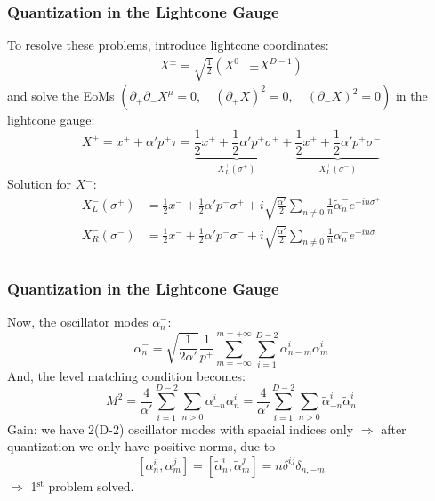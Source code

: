 \documentclass[aspectratio=169]{beamer}
\begin{document}
	\begin{frame}
		\frametitle{Quantization in the Lightcone Gauge}
		To resolve these problems, introduce lightcone coordinates:
		\begin{align*}
			X^\pm = \sqrt{\frac{1}{2}} \left(X^0\right.&\left.\pm X^{D-1}\right)
		\end{align*}
		and solve the EoMs $\left(\partial_+\partial_-X^\mu = 0, \quad (\partial_+X)^2 = 0, \quad (\partial_-X)^2 = 0 \right)$  in the lightcone gauge: 
		\begin{equation*}
			X^+ = x^+ + \alpha'p^+ \tau = \underbrace{\frac{1}{2}x^+ + \frac{1}{2} \alpha' p^+ \sigma^+}_{X^+_L(\sigma^+)} + \underbrace{\frac{1}{2}x^+ + \frac{1}{2} \alpha' p^+ \sigma^-}_{X^+_L(\sigma^-)}
		\end{equation*}
		Solution for $X^-$:
		\begin{align*}
			X^-_L(\sigma^+) &= \frac{1}{2}x^- + \frac{1}{2} \alpha' p^- \sigma^+ + i \sqrt{\frac{\alpha'}{2}} \sum_{n\neq 0} \frac{1}{n}\tilde{\alpha}^-_n e^{-in\sigma^+}\\
			X^-_R(\sigma^-) &= \frac{1}{2}x^- + \frac{1}{2} \alpha' p^-\sigma^- + i \sqrt{\frac{\alpha'}{2}} \sum_{n\neq 0} \frac{1}{n}\alpha^-_n e^{-in\sigma^-} \\
		\end{align*}
	\end{frame}

	\begin{frame}
		\frametitle{Quantization in the Lightcone Gauge}
		Now, the oscillator modes $\alpha^-_n$:
		\begin{equation*}
			\alpha_n^- = \sqrt{\frac{1}{2\alpha'}} \frac{1}{p^+} \sum_{m=-\infty}^{m=+\infty}\sum_{i=1}^{D-2}\alpha^i_{n-m}\alpha^i_m
		\end{equation*}
		And, the level matching condition becomes:
		\begin{equation*}
			M^2 = \frac{4}{\alpha'} \sum_{i=1}^{D-2}\sum_{n>0}^{}\alpha^i_{-n}\alpha^i_n = \frac{4}{\alpha'} \sum_{i=1}^{D-2}\sum_{n>0}^{}\tilde{\alpha}^i_{-n}\tilde{\alpha}^i_n 
		\end{equation*}
		Gain: we have 2(D-2) oscillator modes with spacial indices only $\Rightarrow$ after quantization we only have positive norms, due to
		\begin{equation*}
			\left[\alpha^i_n,\alpha^j_m\right]=\left[\tilde\alpha^i_n,\tilde\alpha^j_m\right] = n\delta^{ij}\delta_{n,-m}
		\end{equation*}
		$\Rightarrow$ 1$^{\text{st}}$ problem solved.
	\end{frame}
\end{document}
